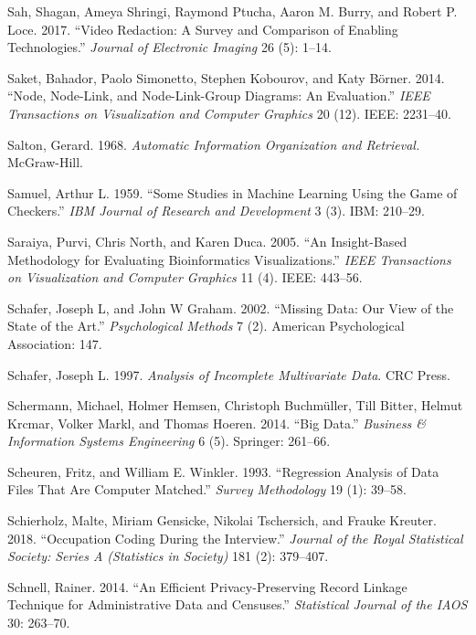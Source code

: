 \documentclass[]{krantz}
\begin{document}
\hypertarget{ref-Sah2017}{}
Sah, Shagan, Ameya Shringi, Raymond Ptucha, Aaron M. Burry, and Robert
P. Loce. 2017. ``Video Redaction: A Survey and Comparison of Enabling
Technologies.'' \emph{Journal of Electronic Imaging} 26 (5): 1--14.

\hypertarget{ref-saket2014node}{}
Saket, Bahador, Paolo Simonetto, Stephen Kobourov, and Katy Börner.
2014. ``Node, Node-Link, and Node-Link-Group Diagrams: An Evaluation.''
\emph{IEEE Transactions on Visualization and Computer Graphics} 20 (12).
IEEE: 2231--40.

\hypertarget{ref-salton-68}{}
Salton, Gerard. 1968. \emph{Automatic Information Organization and
Retrieval.} McGraw-Hill.

\hypertarget{ref-samuel1959some}{}
Samuel, Arthur L. 1959. ``Some Studies in Machine Learning Using the
Game of Checkers.'' \emph{IBM Journal of Research and Development} 3
(3). IBM: 210--29.

\hypertarget{ref-saraiya2005insight}{}
Saraiya, Purvi, Chris North, and Karen Duca. 2005. ``An Insight-Based
Methodology for Evaluating Bioinformatics Visualizations.'' \emph{IEEE
Transactions on Visualization and Computer Graphics} 11 (4). IEEE:
443--56.

\hypertarget{ref-schafer2002missing}{}
Schafer, Joseph L, and John W Graham. 2002. ``Missing Data: Our View of
the State of the Art.'' \emph{Psychological Methods} 7 (2). American
Psychological Association: 147.

\hypertarget{ref-schafer1997analysis}{}
Schafer, Joseph L. 1997. \emph{Analysis of Incomplete Multivariate
Data}. CRC Press.

\hypertarget{ref-schermann2014big}{}
Schermann, Michael, Holmer Hemsen, Christoph Buchmüller, Till Bitter,
Helmut Krcmar, Volker Markl, and Thomas Hoeren. 2014. ``Big Data.''
\emph{Business \& Information Systems Engineering} 6 (5). Springer:
261--66.

\hypertarget{ref-scheuren1993regression}{}
Scheuren, Fritz, and William E. Winkler. 1993. ``Regression Analysis of
Data Files That Are Computer Matched.'' \emph{Survey Methodology} 19
(1): 39--58.

\hypertarget{ref-Schierholz2018}{}
Schierholz, Malte, Miriam Gensicke, Nikolai Tschersich, and Frauke
Kreuter. 2018. ``Occupation Coding During the Interview.'' \emph{Journal
of the Royal Statistical Society: Series A (Statistics in Society)} 181
(2): 379--407.

\hypertarget{ref-schnell2014efficient}{}
Schnell, Rainer. 2014. ``An Efficient Privacy-Preserving Record Linkage
Technique for Administrative Data and Censuses.'' \emph{Statistical
Journal of the IAOS} 30: 263--70.
\end{document}

